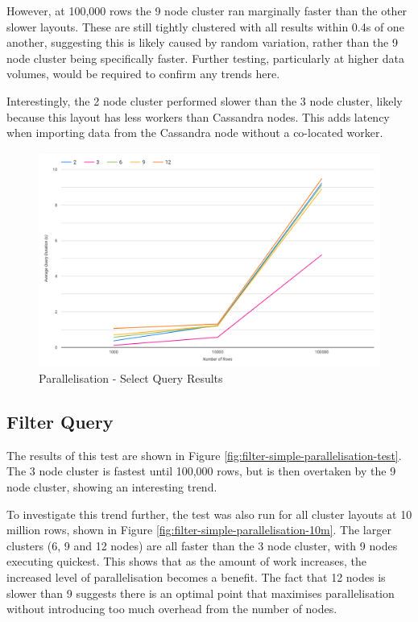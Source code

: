 However, at 100,000 rows the 9 node cluster ran marginally faster than the other slower layouts. These are still tightly clustered with all results within 0.4s of one another, suggesting this is likely caused by random variation, rather than the 9 node cluster being specifically faster. Further testing, particularly at higher data volumes, would be required to confirm any trends here. 

Interestingly, the 2 node cluster performed slower than the 3 node cluster, likely because this layout has less workers than Cassandra nodes. This adds latency when importing data from the Cassandra node without a co-located worker. 

\begin{figure}[ht]
	\centering
	\includegraphics[width=0.8\linewidth]{chapters/diagrams/testing/select-simple-parallelisation-test}
	\caption{Parallelisation - Select Query Results} 
	\label{fig:select-simple-parallelisation-test}
\end{figure}

\pagebreak
\subsection{Filter Query}
The results of this test are shown in Figure \ref{fig:filter-simple-parallelisation-test}. The 3 node cluster is fastest until 100,000 rows, but is then overtaken by the 9 node cluster, showing an interesting trend.

To investigate this trend further, the test was also run for all cluster layouts at 10 million rows, shown in Figure \ref{fig:filter-simple-parallelisation-10m}. The larger clusters (6, 9 and 12 nodes) are all faster than the 3 node cluster, with 9 nodes executing quickest. This shows that as the amount of work increases, the increased level of parallelisation becomes a benefit. The fact that 12 nodes is slower than 9 suggests there is an optimal point that maximises parallelisation without introducing too much overhead from the number of nodes.

